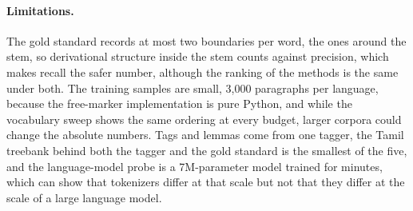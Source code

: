 \paragraph{Limitations.}
The gold standard records at most two boundaries per word, the ones around the stem, so derivational structure inside the stem counts against precision, which makes recall the safer number, although the ranking of the methods is the same under both.
The training samples are small, 3,000 paragraphs per language, because the free-marker implementation is pure Python, and while the vocabulary sweep shows the same ordering at every budget, larger corpora could change the absolute numbers.
Tags and lemmas come from one tagger, the Tamil treebank behind both the tagger and the gold standard is the smallest of the five, and the language-model probe is a 7M-parameter model trained for minutes, which can show that tokenizers differ at that scale but not that they differ at the scale of a large language model.
